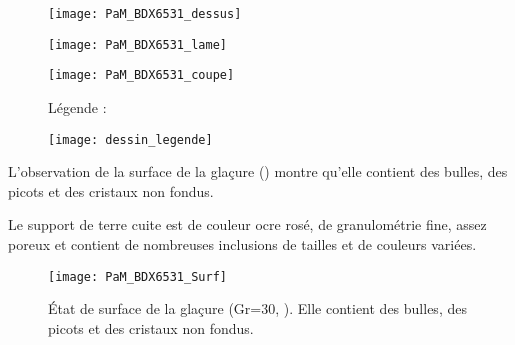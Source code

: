 \begin{figure}[htb]
  \begin{minipage}[t]{0.5\textwidth}
    \centerfloat
    \vspace*{0pt}
    \texttt{[image: PaM\_BDX6531\_dessus]}
  \end{minipage}%
  \quad%
  \begin{minipage}[t]{0.5\textwidth}
    \centerfloat
    \vspace*{0pt}
    \texttt{[image: PaM\_BDX6531\_lame]}
  \end{minipage}

  \bigskip

  \begin{minipage}[t]{0.5\textwidth}
    \centerfloat
    \vspace*{0pt}
    \texttt{[image: PaM\_BDX6531\_coupe]}
  \end{minipage}%
  \quad%
  \begin{minipage}[t]{0.5\textwidth}
    \vspace*{0pt}
    Légende :

    \texttt{[image: dessin\_legende]}
  \end{minipage}
  \caption{\legendeD}
  \label{dessin:6531}
\end{figure}

L'observation de la surface de la glaçure () montre 
qu'elle contient des bulles, des picots et des cristaux non fondus.

Le support de terre cuite est de couleur ocre rosé, de granulométrie
fine, assez poreux et contient de nombreuses inclusions de tailles et
de couleurs variées.

\begin{figure}[htb]
  \texttt{[image: PaM\_BDX6531\_Surf]}
  \caption{\legendeD 
           État de surface de la glaçure (Gr=30, ). Elle contient des bulles, des 
           picots et des cristaux non fondus.}
  \label{surf:6531}
\end{figure}


